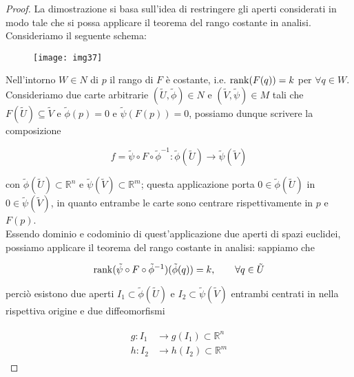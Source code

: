 \begin{proof}
	La dimostrazione si basa sull'idea di restringere gli aperti considerati in modo tale che si possa applicare il teorema del rango costante in analisi.\\
	Consideriamo il seguente schema:
	
	\begin{figure}[H]
		\centering
		\texttt{[image: img37]}
	\end{figure}

	Nell'intorno $ W \in N $ di $ p $ il rango di $ F $ è costante, i.e. $ \rank(F(q)) = k $ per $ \forall q \in W $. Consideriamo due carte arbitrarie $ (\tilde{U},\tilde{\phi}) \in N $ e $ (\tilde{V},\tilde{\psi}) \in M $ tali che $ F(\tilde{U}) \subseteq \tilde{V} $ e $ \tilde{\phi}(p) = 0 $ e $ \tilde{\psi}(F(p)) = 0 $, possiamo dunque scrivere la composizione
	
	\begin{equation}
		f = \tilde{\psi} \circ F \circ \tilde{\phi}^{-1} : \tilde{\phi}(\tilde{U}) \to \tilde{\psi}(\tilde{V})
	\end{equation}

	con $ \tilde{\phi}(\tilde{U}) \subset \mathbb{R}^{n} $ e $ \tilde{\psi}(\tilde{V}) \subset \mathbb{R}^{m} $; questa applicazione porta $ 0 \in \tilde{\phi}(\tilde{U}) $ in $ 0 \in \tilde{\psi}(\tilde{V}) $, in quanto entrambe le carte sono centrare rispettivamente in $ p $ e $ F(p) $.\\
	Essendo dominio e codominio di quest'applicazione due aperti di spazi euclidei, possiamo applicare il teorema del rango costante in analisi: sappiamo che
	
	\begin{equation}
		\rank(\tilde{\psi} \circ F \circ \tilde{\phi}^{-1})(\tilde{\phi}(q)) = k, \qquad \forall q \in \tilde{U}
	\end{equation}

	perciò esistono due aperti $ I_{1} \subset \tilde{\phi}(\tilde{U}) $ e $ I_{2} \subset \tilde{\psi}(\tilde{V}) $ entrambi centrati in nella rispettiva origine e due diffeomorfismi
	
	\begin{align}
		\begin{split}
			g : I_{1} &\to g(I_{1}) \subset \mathbb{R}^{n}\\
			h : I_{2} &\to h(I_{2}) \subset \mathbb{R}^{m}
		\end{split}
	\end{align}


\end{proof}
